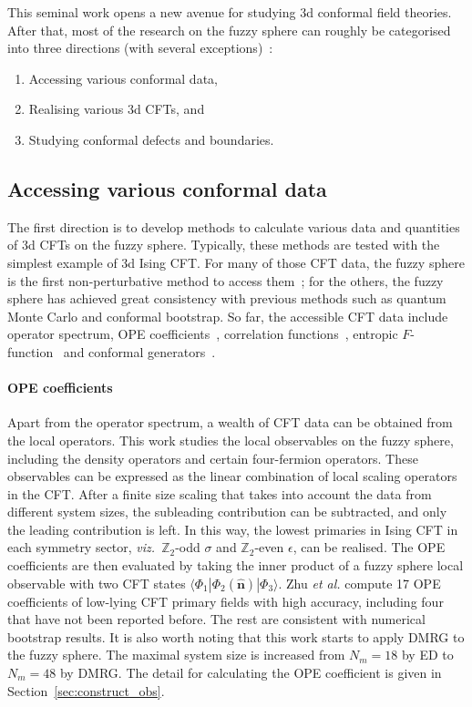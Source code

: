 \documentclass{timesjhep}
\begin{document}
This seminal work opens a new avenue for studying 3d conformal field theories. After that, most of the research on the fuzzy sphere can roughly be categorised into three directions (with several exceptions)~: 

\begin{enumerate} 
    \item Accessing various conformal data, 
    \item Realising various 3d CFTs, and 
    \item Studying conformal defects and boundaries.
\end{enumerate} 

\subsection{Accessing various conformal data}

The first direction is to develop methods to calculate various data and quantities of 3d CFTs on the fuzzy sphere. Typically, these methods are tested with the simplest example of 3d Ising CFT. For many of those CFT data, the fuzzy sphere is the first non-perturbative method to access them~; for the others, the fuzzy sphere has achieved great consistency with previous methods such as quantum Monte Carlo and conformal bootstrap. So far, the accessible CFT data include operator spectrum, OPE coefficients~\cite{Hu2023Mar}, correlation functions~\cite{Han2023Jun}, entropic $F$-function~\cite{Hu2024} and conformal generators~\cite{Fardelli2024,Fan2024}. 

\paragraph{OPE coefficients~\cite{Hu2023Mar}}

Apart from the operator spectrum, a wealth of CFT data can be obtained from the local operators. This work studies the local observables on the fuzzy sphere, including the density operators and certain four-fermion operators. These observables can be expressed as the linear combination of local scaling operators in the CFT. After a finite size scaling that takes into account the data from different system sizes, the subleading contribution can be subtracted, and only the leading contribution is left. In this way, the lowest primaries in Ising CFT in each symmetry sector, \textit{viz.}~$\mathbb{Z}_2$-odd $\sigma$ and $\mathbb{Z}_2$-even $\epsilon$, can be realised. The OPE coefficients are then evaluated by taking the inner product of a fuzzy sphere local observable with two CFT states $\langle\Phi_1|\Phi_2(\hat{\mathbf{n}})|\Phi_3\rangle$. Zhu \textit{et al.} compute 17 OPE coefficients of low-lying CFT primary fields with high accuracy, including four that have not been reported before. The rest are consistent with numerical bootstrap results. It is also worth noting that this work starts to apply DMRG to the fuzzy sphere. The maximal system size is increased from $N_m=18$ by ED to $N_m=48$ by DMRG. The detail for calculating the OPE coefficient is given in Section~\ref{sec:construct_obs}.
\end{document}
